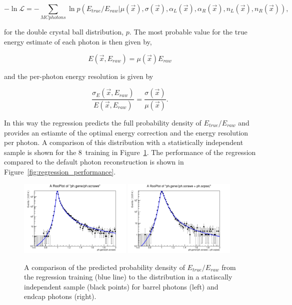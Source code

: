 \begin{equation}
  -\ln \mathcal{L} = - \sum_{MC photons} \ln p(E_{true}/E_{raw} | \mu(\vec{x}),\sigma(\vec{x}),\alpha_{L}(\vec{x}),\alpha_{R}(\vec{x}),n_{L}(\vec{x}),n_{R}(\vec{x})),
\end{equation}

for the double crystal ball distribution, $p$. The most probable value for the true energy estimate of each photon is then given by,

\begin{equation}
  E(\vec{x},E_{raw}) = \mu(\vec{x})E_{raw}
\end{equation}

and the per-photon energy resolution is given by 

\begin{equation}
  \frac{\sigma_{E}(\vec{x},E_{raw})}{E(\vec{x},E_{raw})} = \frac{\sigma(\vec{x})}{\mu(\vec{x})}.
\end{equation}

In this way the regression predicts the full probability density of $E_{true}/E_{raw}$ and provides an estiamte of the optimal energy correction and the energy resolution per photon. A comparison of this distribution with a statistically independent \MC sample is shown for the 8~\TeV training in Figure~\ref{fig:regression_training}. The performance of the regression compared to the default photon reconstruction is shown in Figure~\ref{fig:regression_performance}.

\begin{figure}
  \includegraphics[width=0.48\textwidth]{ch3_comm_anal_comps/plots/regression_barrel.pdf}
  \includegraphics[width=0.48\textwidth]{ch3_comm_anal_comps/plots/regression_endcap.pdf}
  \caption{A comparison of the predicted probability density of $E_{true}/E_{raw}$ from the regression training (blue line) to the distribution in a statiscally independent \MC sample (black points) for barrel photons (left) and endcap photons (right). }
  \label{fig:regression_training}
\end{figure}


